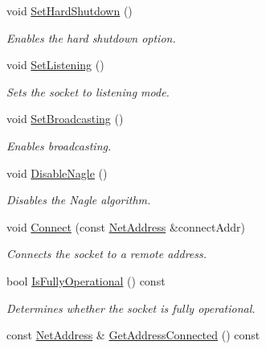 \begin{DoxyCompactItemize}
void \hyperlink{class_net_socket_simple_a3388c97f559fd29258a45d594d5fe401}{SetHardShutdown} ()
\begin{DoxyCompactList}\small\item\em Enables the hard shutdown option. \item\end{DoxyCompactList}\item 
void \hyperlink{class_net_socket_simple_a50f8eb287f99eca4d35f6e4ac208ff7b}{SetListening} ()
\begin{DoxyCompactList}\small\item\em Sets the socket to listening mode. \item\end{DoxyCompactList}\item 
void \hyperlink{class_net_socket_simple_aa35db48386c895d11792a9d67bfe5e50}{SetBroadcasting} ()
\begin{DoxyCompactList}\small\item\em Enables broadcasting. \item\end{DoxyCompactList}\item 
void \hyperlink{class_net_socket_simple_af2aded91865a8a4c42f0973eb141a485}{DisableNagle} ()
\begin{DoxyCompactList}\small\item\em Disables the Nagle algorithm. \item\end{DoxyCompactList}\item 
void \hyperlink{class_net_socket_simple_a8b3d61a80b904f12791144ba336cf37b}{Connect} (const \hyperlink{class_net_address}{NetAddress} \&connectAddr)
\begin{DoxyCompactList}\small\item\em Connects the socket to a remote address. \item\end{DoxyCompactList}\item 
bool \hyperlink{class_net_socket_simple_abc58a547210d4863703cf7fbb32471fc}{IsFullyOperational} () const 
\begin{DoxyCompactList}\small\item\em Determines whether the socket is fully operational. \item\end{DoxyCompactList}\item 
const \hyperlink{class_net_address}{NetAddress} \& \hyperlink{class_net_socket_simple_aaf52eb5ab502e244ad15aba2b3ec3d49}{GetAddressConnected} () const 

\end{DoxyCompactItemize}
